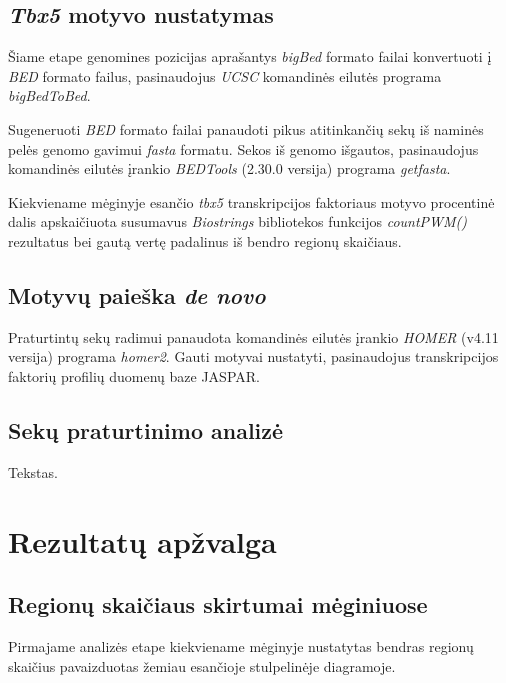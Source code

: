 \documentclass[12pt]{article}
\begin{document}
\subsection{\emph{Tbx5} motyvo nustatymas}
Šiame etape genomines pozicijas aprašantys \emph{bigBed} formato
failai konvertuoti į \emph{BED} formato failus, pasinaudojus
\emph{UCSC} komandinės eilutės programa \emph{bigBedToBed}.

Sugeneruoti \emph{BED} formato failai panaudoti pikus atitinkančių
sekų iš naminės pelės genomo gavimui \emph{fasta} formatu.
Sekos iš genomo išgautos, pasinaudojus komandinės eilutės įrankio
\emph{BEDTools} (2.30.0 versija) programa \emph{getfasta}.

Kiekviename mėginyje esančio \emph{tbx5} transkripcijos faktoriaus
motyvo procentinė dalis apskaičiuota susumavus \emph{Biostrings}
bibliotekos funkcijos \emph{countPWM()} rezultatus bei gautą
vertę padalinus iš bendro regionų skaičiaus.

\subsection{Motyvų paieška \emph{de novo}}
Praturtintų sekų radimui panaudota komandinės eilutės įrankio
\emph{HOMER} (v4.11 versija) programa \emph{homer2}. Gauti
motyvai nustatyti, pasinaudojus transkripcijos faktorių
profilių duomenų baze JASPAR.

\subsection{Sekų praturtinimo analizė}
Tekstas.

\newpage


\section{Rezultatų apžvalga}
\subsection{Regionų skaičiaus skirtumai mėginiuose}
Pirmajame analizės etape kiekviename mėginyje nustatytas bendras
regionų skaičius pavaizduotas žemiau esančioje stulpelinėje
diagramoje.
\end{document}
